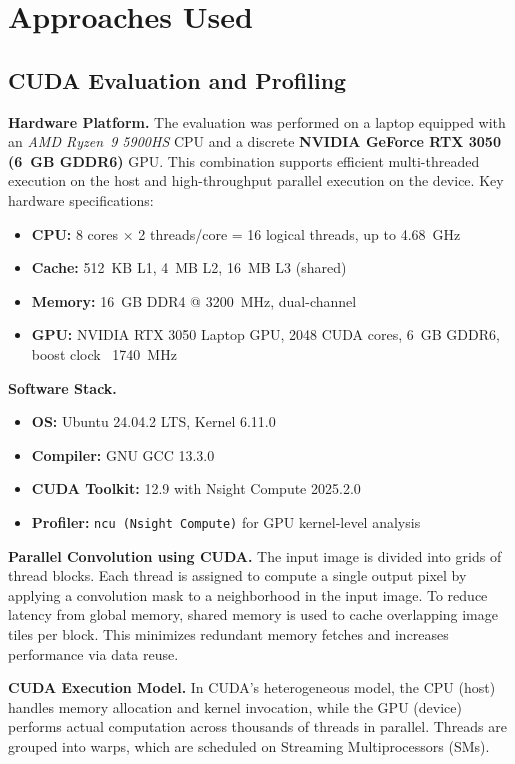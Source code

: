 \documentclass[conference, 10pt]{IEEEtran}
\begin{document}
\section{Approaches Used}

\subsection{\textbf{CUDA Evaluation and Profiling}}

\textbf{Hardware Platform.} 
The evaluation was performed on a laptop equipped with an \textit{AMD Ryzen\texttrademark~9 5900HS} CPU and a discrete \textbf{NVIDIA GeForce RTX 3050 (6~GB GDDR6)} GPU. This combination supports efficient multi-threaded execution on the host and high-throughput parallel execution on the device. Key hardware specifications:

\begin{itemize}
    \item \textbf{CPU:} 8 cores $\times$ 2 threads/core = 16 logical threads, up to 4.68~GHz
    \item \textbf{Cache:} 512~KB L1, 4~MB L2, 16~MB L3 (shared)
    \item \textbf{Memory:} 16~GB DDR4 @ 3200~MHz, dual-channel
    \item \textbf{GPU:} NVIDIA RTX 3050 Laptop GPU, 2048 CUDA cores, 6~GB GDDR6, boost clock ~1740~MHz
\end{itemize}

\textbf{Software Stack.}
\begin{itemize}
    \item \textbf{OS:} Ubuntu 24.04.2 LTS, Kernel 6.11.0
    \item \textbf{Compiler:} GNU GCC 13.3.0
    \item \textbf{CUDA Toolkit:} 12.9 with Nsight Compute 2025.2.0
    \item \textbf{Profiler:} \texttt{ncu (Nsight Compute)} for GPU kernel-level analysis
\end{itemize}

\textbf{Parallel Convolution using CUDA.}  
The input image is divided into grids of thread blocks. Each thread is assigned to compute a single output pixel by applying a convolution mask to a neighborhood in the input image. To reduce latency from global memory, shared memory is used to cache overlapping image tiles per block. This minimizes redundant memory fetches and increases performance via data reuse.

\textbf{CUDA Execution Model.}  
In CUDA's heterogeneous model, the CPU (host) handles memory allocation and kernel invocation, while the GPU (device) performs actual computation across thousands of threads in parallel. Threads are grouped into warps, which are scheduled on Streaming Multiprocessors (SMs).
\end{document}
